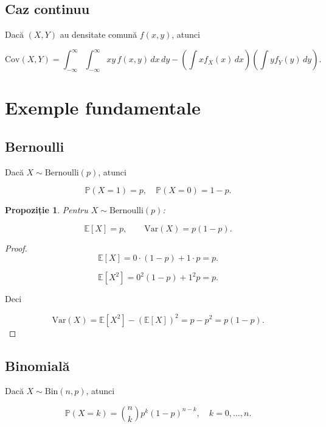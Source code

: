 \documentclass[12pt]{article}
\theoremstyle{plain}
\newtheorem{proposition}{Propoziție}
\begin{document}
\subsection{Caz continuu}

Dacă $(X,Y)$ au densitate comună $f(x,y)$, atunci


\[
\mathrm{Cov}(X,Y)
= \int_{-\infty}^{\infty}\int_{-\infty}^{\infty}
xy\, f(x,y)\, dx\, dy
- \left(\int x f_X(x)\, dx\right)
  \left(\int y f_Y(y)\, dy\right).
\]



\section{Exemple fundamentale}

\subsection{Bernoulli}

Dacă $X \sim \mathrm{Bernoulli}(p)$, atunci


\[
\mathbb{P}(X=1)=p,\quad \mathbb{P}(X=0)=1-p.
\]



\begin{proposition}
Pentru $X \sim \mathrm{Bernoulli}(p)$:


\[
\mathbb{E}[X] = p,\qquad
\mathrm{Var}(X) = p(1-p).
\]


\end{proposition}

\begin{proof}


\[
\mathbb{E}[X] = 0\cdot(1-p) + 1\cdot p = p.
\]




\[
\mathbb{E}[X^2] = 0^2(1-p) + 1^2 p = p.
\]


Deci


\[
\mathrm{Var}(X) = \mathbb{E}[X^2] - (\mathbb{E}[X])^2 = p - p^2 = p(1-p).
\]


\end{proof}

\subsection{Binomială}

Dacă $X \sim \mathrm{Bin}(n,p)$, atunci


\[
\mathbb{P}(X=k) = \binom{n}{k} p^k (1-p)^{n-k},\quad k=0,\dots,n.
\]
\end{document}
